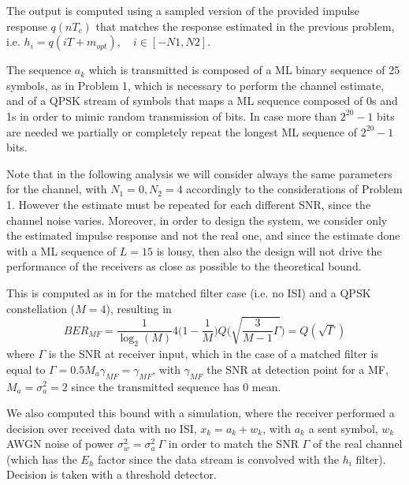 \documentclass[10pt]{article}
\begin{document}
The output is computed using a sampled version of the provided impulse response $q(nT_c)$ that matches the response estimated in the previous problem, i.e. $h_i = q(iT + m_{opt}), \quad i \in [-N1, N2]$. 

The sequence $a_k$ which is transmitted is composed of a ML binary sequence of 25 symbols, as in Problem 1, which is necessary to perform the channel estimate, and of a QPSK stream of symbols that maps a ML sequence composed of 0s and 1s in order to mimic random transmission of bits. In case more than $2^{20}-1$ bits are needed we partially or completely repeat the longest ML sequence of $2^{20}-1$ bits.

Note that in the following analysis we will consider always the same parameters for the channel, with $N_1 = 0, N_2 = 4$ accordingly to the considerations of Problem 1. However the estimate must be repeated for each different SNR, since the channel noise varies. Moreover, in order to design the system, we consider only the estimated impulse response and not the real one, and since the estimate done with a ML sequence of $L = 15$ is lousy, then also the design will not drive the performance of the receivers as close as possible to the theoretical bound. 

This is computed as in \cite{bc} for the matched filter case (i.e. no ISI) and a QPSK constellation ($M=4$), resulting in 
\begin{equation}
	BER_{MF} = \frac{1}{\log_2 (M)} 4 \bigg(1- \frac{1}{M} \bigg) Q\bigg(\sqrt{\frac{3}{M-1} \Gamma}\bigg) = Q(\sqrt{\Gamma})
	\label{eq:BERmf}
\end{equation}
where $\Gamma$ is the SNR at receiver input, which in the case of a matched filter is equal to $\Gamma = 0.5 M_a \gamma_{MF}= \gamma_{MF}$, with $\gamma_{MF}$ the SNR at detection point for a MF, $M_a = \sigma_a^2 = 2$ since the transmitted sequence has 0 mean.

We also computed this bound with a simulation, where the receiver performed a decision over received data with no ISI, $x_k = a_k + w_k$, with $a_k$ a sent symbol, $w_k$ AWGN noise of power $\sigma_w^2 = \sigma_a^2 \ \Gamma$ in order to match the SNR $\Gamma$ of the real channel (which has the $E_h$ factor since the data stream is convolved with the $h_i$ filter). Decision is taken with a threshold detector.

\end{document}
